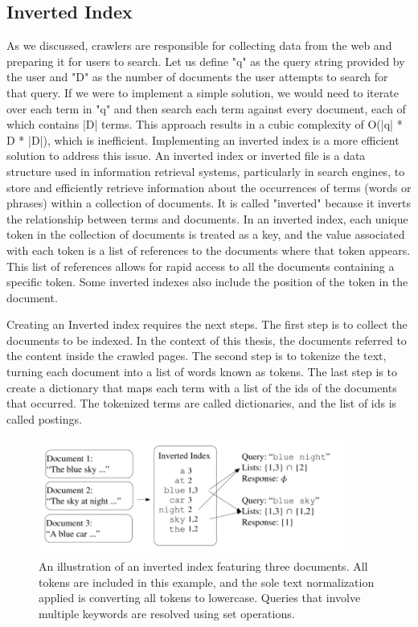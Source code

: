 \subsection*{Inverted Index}\label{sec:inverted-index}
As we discussed, crawlers are responsible for collecting data from the web and preparing it for users to search. Let us define "q" as the query string provided by the user and "D" as the number of documents the user attempts to search for that query. If we were to implement a simple solution, we would need to iterate over each term in "q" and then search each term against every document, each of which contains |D| terms. This approach results in a cubic complexity of O(|q| * D * |D|), which is inefficient. Implementing an inverted index is a more efficient solution to address this issue. An inverted index or inverted file is a data structure used in information retrieval systems, particularly in search engines, to store and efficiently retrieve information about the occurrences of terms (words or phrases) within a collection of documents. It is called "inverted" because it inverts the relationship between terms and documents.
In an inverted index, each unique token in the collection of documents is treated as a key, and the value associated with each token is a list of references to the documents where that token appears. This list of references allows for rapid access to all the documents containing a specific token. Some inverted indexes also include the position of the token in the document. 

Creating an Inverted index requires the next steps. The first step is to collect the documents to be indexed. In the context of this thesis, the documents referred to the content inside the crawled pages. The second step is to tokenize the text, turning each document into a list of words known as tokens. The last step is to create a dictionary that maps each term with a list of the ids of the documents that occurred. The tokenized terms are called dictionaries, and the list of ids is called postings. 

\begin{figure}[h]	
     \centering
     \includegraphics[width=10cm]{figures/inverted_index.png}
     \caption{
An illustration of an inverted index featuring three documents. All tokens are included in this example, and the sole text normalization applied is converting all tokens to lowercase. Queries that involve multiple keywords are resolved using set operations. \cite{castillo2005effective}}
     \label{fig:inverted-index-docs}
\end{figure}

